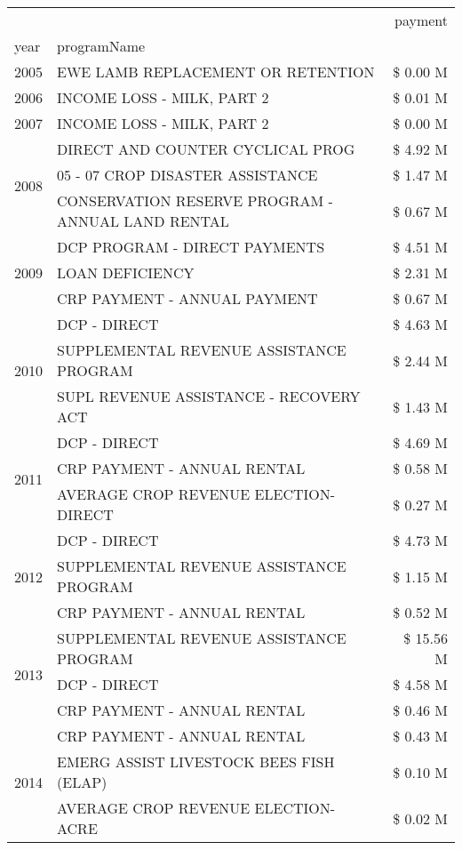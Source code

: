 \begin{tabular}{llr}
\toprule
 &  & payment \\
year & programName &  \\
\midrule
2005 & EWE LAMB REPLACEMENT OR RETENTION & \$ 0.00 M \\
\cline{1-3}
2006 & INCOME LOSS - MILK, PART 2 & \$ 0.01 M \\
\cline{1-3}
2007 & INCOME LOSS - MILK, PART 2 & \$ 0.00 M \\
\cline{1-3}
\multirow[t]{3}{*}{2008} & DIRECT AND COUNTER CYCLICAL PROG & \$ 4.92 M \\
 & 05 - 07 CROP DISASTER ASSISTANCE & \$ 1.47 M \\
 & CONSERVATION RESERVE PROGRAM - ANNUAL LAND RENTAL & \$ 0.67 M \\
\cline{1-3}
\multirow[t]{3}{*}{2009} & DCP PROGRAM - DIRECT PAYMENTS & \$ 4.51 M \\
 & LOAN DEFICIENCY & \$ 2.31 M \\
 & CRP PAYMENT - ANNUAL PAYMENT & \$ 0.67 M \\
\cline{1-3}
\multirow[t]{3}{*}{2010} & DCP - DIRECT & \$ 4.63 M \\
 & SUPPLEMENTAL REVENUE ASSISTANCE PROGRAM & \$ 2.44 M \\
 & SUPL REVENUE ASSISTANCE - RECOVERY ACT & \$ 1.43 M \\
\cline{1-3}
\multirow[t]{3}{*}{2011} & DCP - DIRECT & \$ 4.69 M \\
 & CRP PAYMENT - ANNUAL RENTAL & \$ 0.58 M \\
 & AVERAGE CROP REVENUE ELECTION-DIRECT & \$ 0.27 M \\
\cline{1-3}
\multirow[t]{3}{*}{2012} & DCP - DIRECT & \$ 4.73 M \\
 & SUPPLEMENTAL REVENUE ASSISTANCE PROGRAM & \$ 1.15 M \\
 & CRP PAYMENT - ANNUAL RENTAL & \$ 0.52 M \\
\cline{1-3}
\multirow[t]{3}{*}{2013} & SUPPLEMENTAL REVENUE ASSISTANCE PROGRAM & \$ 15.56 M \\
 & DCP - DIRECT & \$ 4.58 M \\
 & CRP PAYMENT - ANNUAL RENTAL & \$ 0.46 M \\
\cline{1-3}
\multirow[t]{3}{*}{2014} & CRP PAYMENT - ANNUAL RENTAL & \$ 0.43 M \\
 & EMERG ASSIST LIVESTOCK BEES FISH (ELAP) & \$ 0.10 M \\
 & AVERAGE CROP REVENUE ELECTION-ACRE & \$ 0.02 M \\
\cline{1-3}

\end{tabular}
